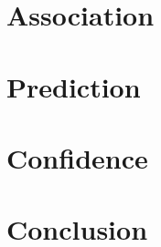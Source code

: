 \documentclass{wissdoc}
\numberwithin{algocf}{chapter}
\newcommand{\blankpage}{
 \clearpage{\pagestyle{empty}\cleardoublepage}
}
\begin{document}
	\part{Association}
		\label{part:association}
		
		
		
		
	\part{Prediction}
		\label{part:prediction}
		
		
		

	\part{Confidence}
		\label{part:confidence}
		
		
		
	\part{Conclusion}
		\label{part:conclusion}
		
		
	
	
	\ifnotonesideelse{\blankpage}{}
	
	

	\ifnotdraft{		
		\ifnotonesideelse{\blankpage}{}
		\begingroup\let\newpage\relax\printglossaries\endgroup
				
		\ifnotonesideelse{\blankpage}{}
		\printindex		
		
		\ifnotonesideelse{\blankpage}{}
		\listoffigures		
		
		\ifnotonesideelse{\blankpage}{}
		\listoftables		
		
	}
\end{document}
